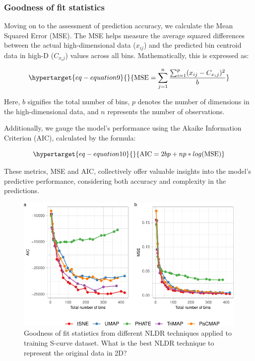 \documentclass[
  12pt]{article}
\begin{document}
\hypertarget{goodness-of-fit-statistics}{%
\subsubsection{Goodness of fit
statistics}\label{goodness-of-fit-statistics}}

Moving on to the assessment of prediction accuracy, we calculate the
Mean Squared Error (MSE). The MSE helps measure the average squared
differences between the actual high-dimensional data (\(x_{ij}\)) and
the predicted bin centroid data in high-D (\(C_{x_ij}\)) values across
all bins. Mathematically, this is expressed as:

\begin{equation}\protect\hypertarget{eq-equation9}{}{
\text{MSE} = \sum_{j = 1}^{n} \frac{\sum_{i = 1}^{p} (x_{ij} - C_{x_ij})^2}{b}
}\label{eq-equation9}\end{equation}

Here, \(b\) signifies the total number of bins, \(p\) denotes the number
of dimensions in the high-dimensional data, and \(n\) represents the
number of observations.

Additionally, we gauge the model's performance using the Akaike
Information Criterion (AIC), calculated by the formula:

\begin{equation}\protect\hypertarget{eq-equation10}{}{
\text{AIC} = 2bp + np * log(\text{MSE})
}\label{eq-equation10}\end{equation}

These metrics, MSE and AIC, collectively offer valuable insights into
the model's predictive performance, considering both accuracy and
complexity in the predictions.

\begin{figure}

{\centering \includegraphics[width=1\textwidth,height=\textheight]{paper_files/figure-pdf/fig-diagnosticpltScurve-1.pdf}

}

\caption{\label{fig-diagnosticpltScurve}Goodness of fit statistics from
different NLDR techniques applied to training S-curve dataset. What is
the best NLDR technique to represent the original data in 2D?}

\end{figure}
\end{document}
